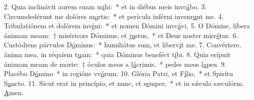 2. Quia inclinávit aurem suam m\uline{i}hi:~* et in diébus meis invc\uline{á}bo.
3. Circumdedérunt me dolóres m\uline{o}rtis:~* et perícula inférni invenr\uline{u}nt me.
4. Tribulatiónem et dolórem inv\uline{é}ni:~* et nomen Dómini invc\uline{á}vi.
5. O Dómine, líbera ánimam meam:~† miséricors Dóminus, et j\uline{u}stus,~* et Deus noster misr\uline{é}tur.
6. Custódiens párvulos D\uline{ó}minus:~* humiliátus sum, et liberv\uline{i}t me.
7. Convértere, ánima mea, in réquiem t\uline{u}am:~* quia Dóminus beneféct t\uline{i}bi.
8. Quia erípuit ánimam meam de morte:~† óculos meos a l\uline{á}crimis,~* pedes meos  l\uline{a}psu.
9. Placébo D\uline{ó}mino~* in regióne vv\uline{ó}rum.
10. Glória Patri, et F\uline{í}lio,~* et Spirítu S\uline{a}ncto.
11. Sicut erat in princípio, et nunc, et s\uline{e}mper,~* et in sǽcula sæculórm. \uline{A}men.
